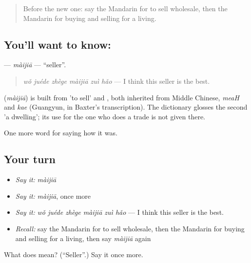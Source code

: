 \label{lesson:ZH-C523-maijia-seller}



\begin{quote}
Before the new one: say the Mandarin for to sell wholesale, then the Mandarin for buying and selling for a living.
\end{quote}

\subsection*{You'll want to know: }
\textbf{} — \emph{màijiā} — \textquotedblleft{}seller\textquotedblright{}.

\begin{quote}
\textbf{} \emph{wǒ juéde zhège màijiā zuì hǎo} — I think this seller is the best.
\end{quote}

\begin{cousinweb}
\textbf{} (\emph{màijiā}) is built from  'to sell' and , both inherited from Middle Chinese, \emph{meaH} and \emph{kae} (Guangyun, in Baxter's transcription). The dictionary glosses the second 'a dwelling'; its use for the one who does a trade is not given there.
\end{cousinweb}

\begin{grammarlens}[title={What you've built}]
One more word for saying how it was.
\end{grammarlens}

\subsection*{Your turn}
\begin{itemize}
\raggedright
  \item \emph{Say it:} \emph{màijiā}
  \item \emph{Say it:} \emph{màijiā}, once more
  \item \emph{Say it:} \emph{wǒ juéde zhège màijiā zuì hǎo} — I think this seller is the best.
  \item \emph{Recall:} say the Mandarin for to sell wholesale, then the Mandarin for buying and selling for a living, then say \emph{màijiā} again
\end{itemize}

\begin{tcolorbox}[breakable,colback=teal!4,colframe=teal!35!black,title={Before you move on}]
What does  mean? (\textquotedblleft{}Seller\textquotedblright{}.) Say it once more.
\end{tcolorbox}
